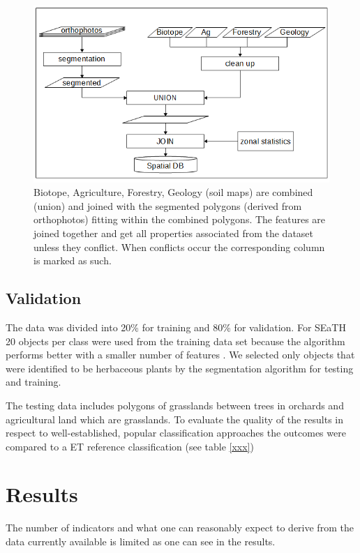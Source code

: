 \documentclass[authoryear, review,12pt,number]{elsarticle}
\begin{document}
\begin{figure} \includegraphics[width=1\textwidth]{diagrams/pre_processing.png}
    \caption{Biotope, Agriculture, Forestry, Geology (soil maps) are combined 
    (union) and joined with the segmented polygons (derived from orthophotos) 
    fitting within the combined polygons. The features are joined together 
    and get all properties associated from the dataset unless they conflict. 
    When conflicts occur the corresponding column is marked as such.}
\label{fig_pre-processing}
\end{figure}

\subsection{Validation} 
The data was divided into 20\% for training and 80\% for validation. For SEaTH
20 objects per class were used from the training data set because the algorithm
performs better with a smaller number of features \citep{Nussbaum2006}. We 
selected only objects that were identified to be herbaceous plants by the 
segmentation algorithm for testing and training. 

The testing 
data includes polygons of grasslands between trees in orchards and 
agricultural land which are grasslands. To evaluate the quality of the results
in respect to well-established, popular classification approaches the outcomes
 were compared to a ET reference classification (see table \ref{xxx})

\section{Results}
The number of indicators and what one can reasonably expect to derive from the
data currently available is limited as one can see in the results.
\end{document}
